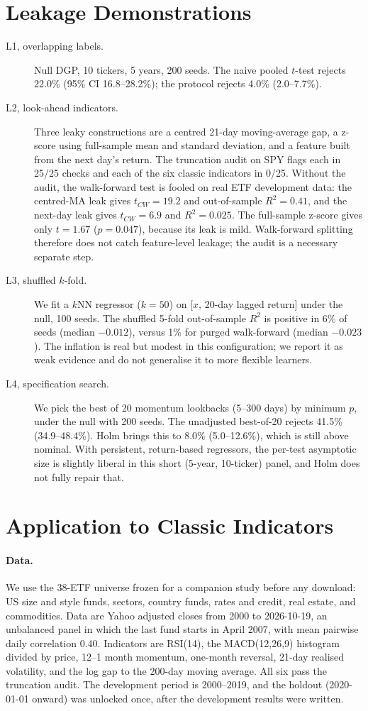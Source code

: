 \documentclass[11pt]{article}
\begin{document}
\section{Leakage Demonstrations}\label{sec:leak}
\begin{description}
\item[L1, overlapping labels.] Null DGP, 10 tickers, 5 years, 200 seeds. The naive pooled $t$-test rejects 22.0\% (95\% CI 16.8--28.2\%); the protocol rejects 4.0\% (2.0--7.7\%).
\item[L2, look-ahead indicators.] Three leaky constructions are a centred 21-day moving-average gap, a z-score using full-sample mean and standard deviation, and a feature built from the next day's return. The truncation audit on SPY flags each in 25/25 checks and each of the six classic indicators in 0/25. Without the audit, the walk-forward test is fooled on real ETF development data: the centred-MA leak gives $t_{CW}=19.2$ and out-of-sample $R^2=0.41$, and the next-day leak gives $t_{CW}=6.9$ and $R^2=0.025$. The full-sample z-score gives only $t=1.67$ ($p=0.047$), because its leak is mild. Walk-forward splitting therefore does not catch feature-level leakage; the audit is a necessary separate step.
\item[L3, shuffled $k$-fold.] We fit a $k$NN regressor ($k=50$) on $[x,\,$20-day lagged return$]$ under the null, 100 seeds. The shuffled 5-fold out-of-sample $R^2$ is positive in 6\% of seeds (median $-0.012$), versus 1\% for purged walk-forward (median $-0.023$). The inflation is real but modest in this configuration; we report it as weak evidence and do not generalise it to more flexible learners.
\item[L4, specification search.] We pick the best of 20 momentum lookbacks (5--300 days) by minimum $p$, under the null with 200 seeds. The unadjusted best-of-20 rejects 41.5\% (34.9--48.4\%). Holm brings this to 8.0\% (5.0--12.6\%), which is still above nominal. With persistent, return-based regressors, the per-test asymptotic size is slightly liberal in this short (5-year, 10-ticker) panel, and Holm does not fully repair that.
\end{description}

\section{Application to Classic Indicators}\label{sec:real}
\paragraph{Data.} We use the 38-ETF universe frozen for a companion study before any download: US size and style funds, sectors, country funds, rates and credit, real estate, and commodities. Data are Yahoo adjusted closes from 2000 to 2026-10-19, an unbalanced panel in which the last fund starts in April 2007, with mean pairwise daily correlation 0.40. Indicators are RSI(14), the MACD(12,26,9) histogram divided by price, 12--1 month momentum, one-month reversal, 21-day realised volatility, and the log gap to the 200-day moving average. All six pass the truncation audit. The development period is 2000--2019, and the holdout (2020-01-01 onward) was unlocked once, after the development results were written.
\end{document}
